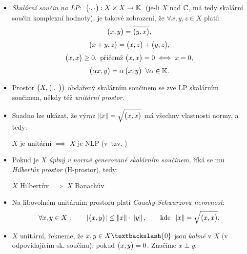 \begin{itemize}
    \item \emph{Skalární součin na LP}: $\; \big( \cdot, \cdot \big): X \times X \to \mathbb{K} \;$ (je-li $X$ nad $\mathbb{C}$, má tedy skalární součin komplexní hodnoty), je takové zobrazení, že $\forall x, y, z \in X$ platí:
    \begin{gather*}
        \big( x, y \big) = \overline{\big( y, x \big)},
        \\[3pt]
        \big( x+y, z \big) = \big( x, z \big) + \big( y, z \big),
        \\[3pt]
        \big( x, x \big) \geq 0,
        \text{ přičemž }
        \big( x, x \big) = 0
        \iff x = 0,
        \\[3pt]
        \big( \alpha x, y \big) =
        \alpha \, \big( x, y \big)
        \;\; \forall \alpha \in \mathbb{K}.
    \end{gather*}
    
    \item Prostor $\big(X, \big( \cdot, \cdot \big)\big)$ obdařený skalárním součinem se zve LP skalárním součinem, někdy též \emph{unitární prostor}.
    
    \item Snadno lze ukázat, že výraz $\left\lVert x\right\rVert = \sqrt{\big( x, x \big)}$ má všechny vlastnosti normy, a tedy:
    
    $X$ je unitární $\implies$ $X$ je NLP (v~tzv. )
    
    \item Pokud je $X$ \emph{úplný v normě generované skalárním součinem}, říká se mu \emph{Hilbertův prostor} (H-prostor), tedy:
    
    $X$ Hilbertův $\implies$ $X$ Banachův
    
    \item Na libovolném unitárním prostoru platí \emph{Cauchy-Schwarzova nerovnost}:
    $$
        \forall x,y \in X:
        \hspace{2em}
        |\big( x, y \big)| \leq \left\lVert x\right\rVert \cdot \left\lVert y\right\rVert,
        \hspace{2em}
        \text{kde }
        \left\lVert x\right\rVert = \sqrt{\big( x, x \big)}.
    $$
    
    \item $X$ unitární, řekneme, že $x,y \in X \textbackslash \{0\}$ jsou \emph{kolmé} v $X$ (v odpovídajícím sk. součinu), pokud $\big( x, y \big) = 0$. Značíme $x \perp y$.
\end{itemize}


